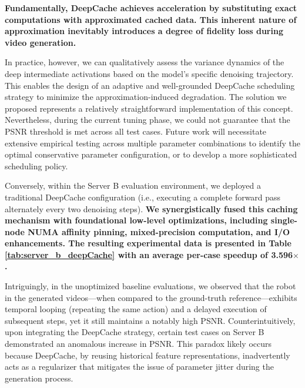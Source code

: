 \textbf{Fundamentally, DeepCache achieves acceleration by substituting exact computations with approximated cached data. This inherent nature of approximation inevitably introduces a degree of fidelity loss during video generation.}

In practice, however, we can qualitatively assess the variance dynamics of the deep intermediate activations based on the model's specific denoising trajectory. This enables the design of an adaptive and well-grounded DeepCache scheduling strategy to minimize the approximation-induced degradation. The solution we proposed represents a relatively straightforward implementation of this concept. Nevertheless, during the current tuning phase, we could not guarantee that the PSNR threshold is met across all test cases. Future work will necessitate extensive empirical testing across multiple parameter combinations to identify the optimal conservative parameter configuration, or to develop a more sophisticated scheduling policy.

Conversely, within the Server B evaluation environment, we deployed a traditional DeepCache configuration (i.e., executing a complete forward pass alternately every two denoising steps). 
\textbf{We synergistically fused this caching mechanism with foundational low-level optimizations, including single-node NUMA affinity pinning, mixed-precision computation, and I/O enhancements. 
The resulting experimental data is presented in Table \ref{tab:server_b_deepCache}  with  an average per-case speedup of 3.596$\times$.}

Intriguingly, in the unoptimized baseline evaluations, we observed that the robot in the generated videos—when compared to the ground-truth reference—exhibits temporal looping (repeating the same action) and a delayed execution of subsequent steps, yet it still maintains a notably high PSNR. Counterintuitively, upon integrating the DeepCache strategy, certain test cases on Server B demonstrated an anomalous increase in PSNR. This paradox likely occurs because DeepCache, by reusing historical feature representations, inadvertently acts as a regularizer that mitigates the issue of parameter jitter during the generation process.


